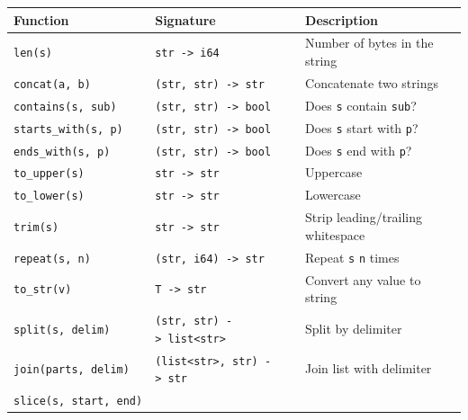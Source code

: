 \documentclass[
  english,
]{book}
\begin{document}
\begin{longtable}[]{@{}
  >{\raggedright\arraybackslash}p{}
  >{\raggedright\arraybackslash}p{}
  >{\raggedright\arraybackslash}p{}@{}}
\toprule\noalign{}
\begin{minipage}[b]{\linewidth}\raggedright
Function
\end{minipage} & \begin{minipage}[b]{\linewidth}\raggedright
Signature
\end{minipage} & \begin{minipage}[b]{\linewidth}\raggedright
Description
\end{minipage} \\
\midrule\noalign{}
\endhead
\bottomrule\noalign{}
\endlastfoot
\texttt{len(s)} & \texttt{str\ -\textgreater{}\ i64} & Number of bytes
in the string \\
\texttt{concat(a,\ b)} & \texttt{(str,\ str)\ -\textgreater{}\ str} &
Concatenate two strings \\
\texttt{contains(s,\ sub)} & \texttt{(str,\ str)\ -\textgreater{}\ bool}
& Does \texttt{s} contain \texttt{sub}? \\
\texttt{starts\_with(s,\ p)} &
\texttt{(str,\ str)\ -\textgreater{}\ bool} & Does \texttt{s} start with
\texttt{p}? \\
\texttt{ends\_with(s,\ p)} & \texttt{(str,\ str)\ -\textgreater{}\ bool}
& Does \texttt{s} end with \texttt{p}? \\
\texttt{to\_upper(s)} & \texttt{str\ -\textgreater{}\ str} &
Uppercase \\
\texttt{to\_lower(s)} & \texttt{str\ -\textgreater{}\ str} &
Lowercase \\
\texttt{trim(s)} & \texttt{str\ -\textgreater{}\ str} & Strip
leading/trailing whitespace \\
\texttt{repeat(s,\ n)} & \texttt{(str,\ i64)\ -\textgreater{}\ str} &
Repeat \texttt{s} \texttt{n} times \\
\texttt{to\_str(v)} & \texttt{T\ -\textgreater{}\ str} & Convert any
value to string \\
\texttt{split(s,\ delim)} &
\texttt{(str,\ str)\ -\textgreater{}\ list\textless{}str\textgreater{}}
& Split by delimiter \\
\texttt{join(parts,\ delim)} &
\texttt{(list\textless{}str\textgreater{},\ str)\ -\textgreater{}\ str}
& Join list with delimiter \\
\texttt{slice(s,\ start,\ end)} &

\end{longtable}
\end{document}
